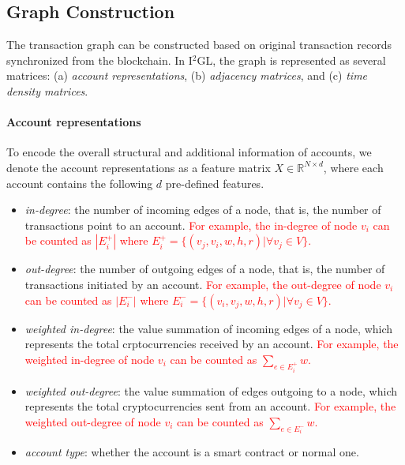\subsection{Graph Construction}
The transaction graph can be constructed based on original transaction records synchronized from the blockchain. In I$^2$GL, the graph is represented as several matrices: (a) \emph{account representations}, (b) \emph{adjacency matrices}, and (c) \emph{time density matrices}.




\paragraph{Account representations} To encode the overall structural and additional information of accounts, we denote the account representations as a feature matrix $X \in \mathbb{R}^{N \times d}$, where each account contains the following $d$ pre-defined features.

\begin{itemize}
	\item \emph{in-degree}: the number of incoming edges of a node, that is, the number of transactions point to an account. \textcolor{red}{For example, the in-degree of node $v_i$ can be counted as $|E_{i}^{+}|$ where $E_{i}^{+}=\{(v_j,v_i,w,h,r)| \forall v_j \in V\}$.}
	\item \emph{out-degree}: the number of outgoing edges of a node, that is, the number of transactions initiated by an account. \textcolor{red}{For example, the out-degree of node $v_i$ can be counted as $|E_{i}^{-}|$ where $E_{i}^{-}=\{(v_i,v_j,w,h,r)| \forall v_j \in V\}$.}
	\item \emph{weighted in-degree}: the value summation of incoming edges of a node, which represents the total crptocurrencies received by an account. \textcolor{red}{For example, the weighted in-degree of node $v_i$ can be counted as $\sum_{e\in E_{i}^{+}}w$.}
	\item \emph{weighted out-degree}: the value summation of edges outgoing to a node, which represents the total cryptocurrencies sent from an account. \textcolor{red}{For example, the weighted out-degree of node $v_i$ can be counted as $\sum_{e\in E_{i}^{-}}w$.}
	\item \emph{account type}: whether the account is a smart contract or normal one.
\end{itemize}

